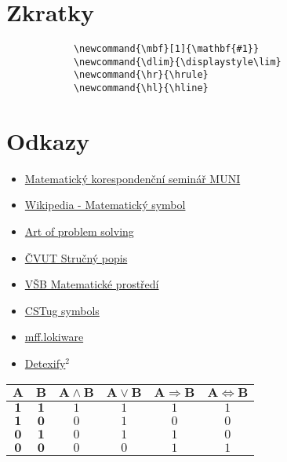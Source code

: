 \documentclass{article}
\newcommand{\hl}{\hline}
\newcommand{\dlim}{\displaystyle\lim}
\newcommand{\mbf}[1]{\mathbf{#1}}
\begin{document}
\begin{multicols}{2}
	\columnbreak

		\section*{Zkratky}
		\begin{verbatim}
			\newcommand{\mbf}[1]{\mathbf{#1}}
			\newcommand{\dlim}{\displaystyle\lim}
			\newcommand{\hr}{\hrule}
			\newcommand{\hl}{\hline}
		\end{verbatim}

		\section*{Odkazy}
		\begin{itemize}
			\item \href{http://mks.mff.cuni.cz/info/tex/psani.php}{Matematický korespondenční seminář MUNI}
			\item \href{http://cs.wikipedia.org/wiki/Matematický_symbol}{Wikipedia - Matematický symbol}
			\item \href{http://www.artofproblemsolving.com/Wiki/index.php/LaTeX:Symbols}{Art of problem solving}
			\item \href{http://mat.fsv.cvut.cz/konickova/navody/ltxstruc.pdf}{ČVUT Stručný popis}
			\item \href{http://www.cs.vsb.cz/benes/vyuka/latex/math.htm}{VŠB Matematické prostředí}
			\item \href{http://ftp.cstug.cz/pub/tex/CTAN/info/symbols/comprehensive/symbols-letter.pdf}{CSTug symbols}
			\item \href{http://mff.lokiware.info/LaTeX}{mff.lokiware}
			\item \href{http://detexify.kirelabs.org/classify.html}{Detexify$^2$}
		\end{itemize}

		\begin{tabular}{cc|cccc}
				$\mbf{A}$	&	$\mbf{B}$	&	$\mbf{A \wedge B}$	&	$\mbf{A \vee B}$	&	$\mbf{A \Rightarrow B}$	&	$\mbf{A \Leftrightarrow B}$	\\\hline
				$\mbf{1}$	&	$\mbf{1}$	&	$1$						&	$1$					&	$1$							&	$1$								\\
				$\mbf{1}$	&	$\mbf{0}$	&	$0$						&	$1$					&	$0$							&	$0$											\\
				$\mbf{0}$	&	$\mbf{1}$	&	$0$						&	$1$					&	$1$							&	$0$											\\
				$\mbf{0}$	&	$\mbf{0}$	&	$0$						&	$0$					&	$1$							&	$1$											\\
			\end{tabular}

	\end{multicols}
\end{document}
